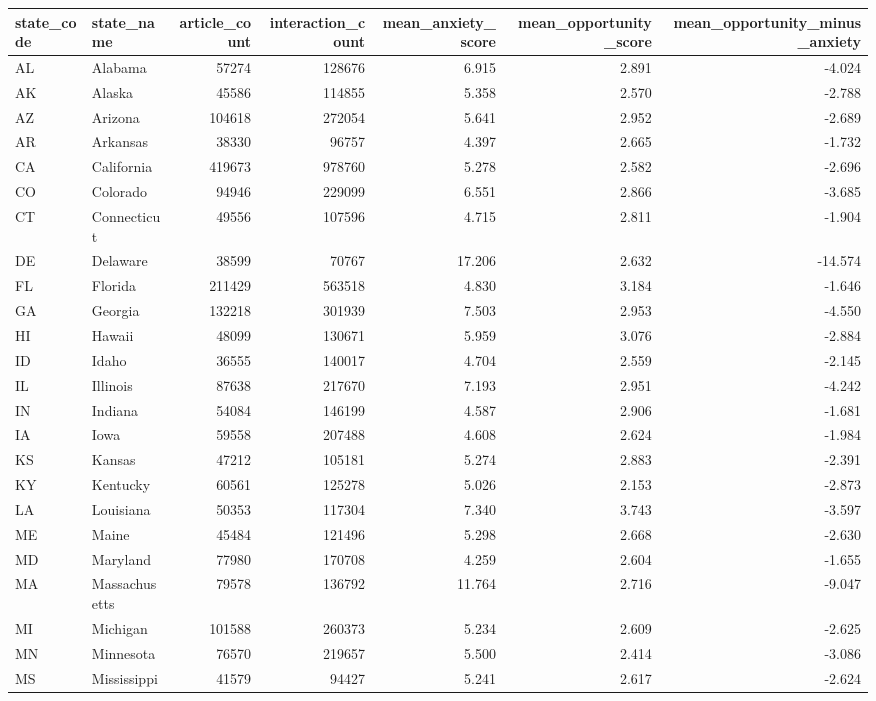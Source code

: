 \begin{tabular}{llrrrrr}
\toprule
state\_code & state\_name & article\_count & interaction\_count & mean\_anxiety\_score & mean\_opportunity\_score & mean\_opportunity\_minus\_anxiety \\
\midrule
AL & Alabama & 57274 & 128676 & 6.915 & 2.891 & -4.024 \\
AK & Alaska & 45586 & 114855 & 5.358 & 2.570 & -2.788 \\
AZ & Arizona & 104618 & 272054 & 5.641 & 2.952 & -2.689 \\
AR & Arkansas & 38330 & 96757 & 4.397 & 2.665 & -1.732 \\
CA & California & 419673 & 978760 & 5.278 & 2.582 & -2.696 \\
CO & Colorado & 94946 & 229099 & 6.551 & 2.866 & -3.685 \\
CT & Connecticut & 49556 & 107596 & 4.715 & 2.811 & -1.904 \\
DE & Delaware & 38599 & 70767 & 17.206 & 2.632 & -14.574 \\
FL & Florida & 211429 & 563518 & 4.830 & 3.184 & -1.646 \\
GA & Georgia & 132218 & 301939 & 7.503 & 2.953 & -4.550 \\
HI & Hawaii & 48099 & 130671 & 5.959 & 3.076 & -2.884 \\
ID & Idaho & 36555 & 140017 & 4.704 & 2.559 & -2.145 \\
IL & Illinois & 87638 & 217670 & 7.193 & 2.951 & -4.242 \\
IN & Indiana & 54084 & 146199 & 4.587 & 2.906 & -1.681 \\
IA & Iowa & 59558 & 207488 & 4.608 & 2.624 & -1.984 \\
KS & Kansas & 47212 & 105181 & 5.274 & 2.883 & -2.391 \\
KY & Kentucky & 60561 & 125278 & 5.026 & 2.153 & -2.873 \\
LA & Louisiana & 50353 & 117304 & 7.340 & 3.743 & -3.597 \\
ME & Maine & 45484 & 121496 & 5.298 & 2.668 & -2.630 \\
MD & Maryland & 77980 & 170708 & 4.259 & 2.604 & -1.655 \\
MA & Massachusetts & 79578 & 136792 & 11.764 & 2.716 & -9.047 \\
MI & Michigan & 101588 & 260373 & 5.234 & 2.609 & -2.625 \\
MN & Minnesota & 76570 & 219657 & 5.500 & 2.414 & -3.086 \\
MS & Mississippi & 41579 & 94427 & 5.241 & 2.617 & -2.624 \\

\end{tabular}

